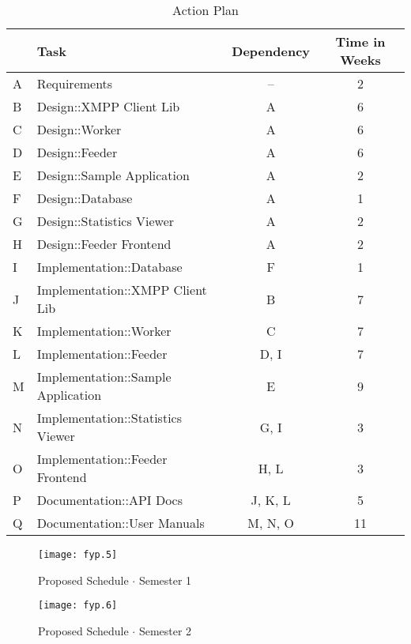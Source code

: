 \begin{table}[H]
\begin{tabularx}{\linewidth}{llcc}
\toprule
\textbf{} & \textbf{Task} & \textbf{Dependency} & \textbf{Time in Weeks} \\
\midrule
\endhead
A & Requirements                       & --      & 2  \\
B & Design::XMPP Client Lib            & A       & 6  \\
C & Design::Worker                     & A       & 6  \\
D & Design::Feeder                     & A       & 6  \\
E & Design::Sample Application         & A       & 2  \\
F & Design::Database                   & A       & 1  \\
G & Design::Statistics Viewer          & A       & 2  \\
H & Design::Feeder Frontend            & A       & 2  \\
I & Implementation::Database           & F       & 1  \\
J & Implementation::XMPP Client Lib    & B       & 7  \\
K & Implementation::Worker             & C       & 7  \\
L & Implementation::Feeder             & D, I    & 7  \\
M & Implementation::Sample Application & E       & 9  \\
N & Implementation::Statistics Viewer  & G, I    & 3  \\
O & Implementation::Feeder Frontend    & H, L    & 3  \\
P & Documentation::API Docs            & J, K, L & 5  \\
Q & Documentation::User Manuals        & M, N, O & 11 \\
\bottomrule
\end{tabularx}
\caption{Action Plan}
\label{tab:fin_actionplan}
\end{table}

\begin{figure}[H]
\begin{flushleft}
\texttt{[image: fyp.5]}
\end{flushleft}
\caption{Proposed Schedule $\cdot$ Semester 1}
\label{fig:fin_gantt1}
\end{figure}

\begin{figure}[H]
\begin{flushleft}
\texttt{[image: fyp.6]}
\end{flushleft}
\caption{Proposed Schedule $\cdot$ Semester 2}
\label{fig:fin_gantt2}
\end{figure}

